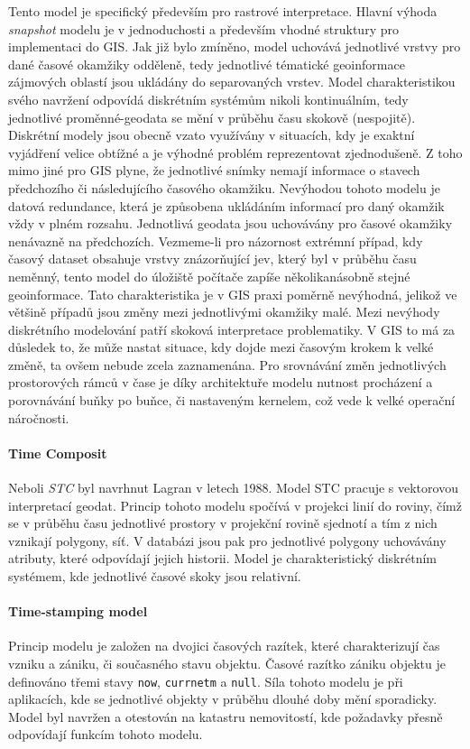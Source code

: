 \documentclass[a4paper,12pt]{report}
\begin{document}
Tento model je specifický především pro rastrové interpretace. Hlavní výhoda  \textit{snapshot} modelu je v jednoduchosti a především vhodné struktury pro implementaci do GIS. Jak již bylo zmíněno, model uchovává jednotlivé vrstvy pro dané časové okamžiky odděleně, tedy jednotlivé tématické geoinformace zájmových oblastí jsou ukládány do separovaných vrstev.  Model  charakteristikou svého navržení odpovídá diskrétním systémům nikoli kontinuálním, tedy jednotlivé proměnné-geodata se mění v průběhu času skokově (nespojitě). Diskrétní modely jsou obecně vzato využívány v situacích, kdy je exaktní vyjádření velice obtížné a je výhodné problém reprezentovat zjednodušeně. Z toho mimo jiné pro GIS plyne, že jednotlivé snímky nemají informace o stavech  předchozího či následujícího časového okamžiku.
Nevýhodou tohoto modelu je datová redundance, která je způsobena ukládáním informací pro daný okamžik vždy v plném rozsahu.  Jednotlivá geodata jsou uchovávány pro časové okamžiky nenávazně na předchozích. Vezmeme-li pro názornost extrémní případ, kdy časový dataset obsahuje vrstvy znázorňující jev, který byl v průběhu času neměnný, tento model do úložiště počítače zapíše několikanásobně stejné geoinformace. Tato charakteristika je v GIS praxi poměrně nevýhodná, jelikož ve většině případů jsou změny mezi jednotlivými okamžiky malé.
Mezi nevýhody diskrétního modelování patří skoková interpretace problematiky. V GIS to má za důsledek to, že může nastat situace, kdy dojde mezi časovým krokem k velké změně, ta ovšem nebude zcela zaznamenána.
Pro srovnávání změn jednotlivých prostorových rámců v čase je díky architektuře modelu nutnost procházení a porovnávání buňky po buňce, či nastaveným kernelem, což vede k velké operační náročnosti.

\paragraph*{Time Composit}
Neboli \textit{\ac{STC}} byl navrhnut Lagran\cite{lagran} v letech 1988. Model \acs{STC} pracuje s vektorovou interpretací geodat.   Princip tohoto modelu spočívá v projekci linií do roviny, čímž se v průběhu času jednotlivé prostory v projekční rovině sjednotí a tím z nich vznikají polygony, síť. V databázi jsou pak pro jednotlivé polygony uchovávány atributy, které odpovídají jejich historii.
Model je charakteristický diskrétním systémem, kde jednotlivé časové skoky jsou relativní.

\paragraph*{Time-stamping model} 
Princip modelu je založen na dvojici časových razítek, které charakterizují čas vzniku a zániku, či současného stavu objektu. Časové razítko zániku objektu je definováno třemi stavy \texttt{now}, \texttt{currnetm}  a \texttt{null}. 
Síla tohoto modelu je při aplikacích, kde se jednotlivé objekty v průběhu dlouhé doby mění sporadicky. Model byl navržen a otestován na katastru nemovitostí, kde požadavky přesně odpovídají funkcím tohoto modelu.\cite{hunter}
\end{document}
